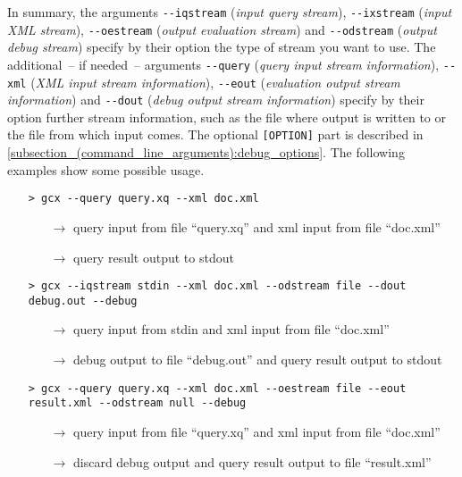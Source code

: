 \noindent In summary, the arguments \texttt{{-}{-}iqstream} (\emph{input query stream}), \texttt{{-}{-}ixstream} (\emph{input XML stream}), \texttt{{-}{-}oestream} (\emph{output evaluation stream}) and \texttt{{-}{-}odstream} (\emph{output debug stream}) specify by their option the type of stream you want to use. The additional~-- if needed~-- arguments \texttt{{-}{-}query} (\emph{query input stream information}), \texttt{{-}{-}xml} (\emph{XML input stream information}), \texttt{{-}{-}eout} (\emph{evaluation output stream information}) and \texttt{{-}{-}dout} (\emph{debug output stream information}) specify by their option further stream information, such as the file where output is written to or the file from which input comes. The optional \texttt{[OPTION]} part is described in \autoref{subsection_(command_line_arguments):debug_options}. The following examples show some possible usage.
\begin{itemize}
  \setlength{\itemsep}{0pt}
  \item[] \texttt{> gcx {-}{-}query query.xq {-}{-}xml doc.xml}
  \begin{itemize}
    \setlength{\itemsep}{0pt}
    \item[$\rightarrow$] query input from file \enquote{query.xq} and xml input from file \enquote{doc.xml}
    \item[$\rightarrow$] query result output to stdout
  \end{itemize}
  \item[] \texttt{> gcx {-}{-}iqstream stdin {-}{-}xml doc.xml {-}{-}odstream file {-}{-}dout debug.out {-}{-}debug}
    \begin{itemize}
    \setlength{\itemsep}{0pt}
    \item[$\rightarrow$] query input from stdin and xml input from file \enquote{doc.xml}
    \item[$\rightarrow$] debug output to file \enquote{debug.out} and query result output to stdout
  \end{itemize}
  \item[] \texttt{> gcx {-}{-}query query.xq {-}{-}xml doc.xml {-}{-}oestream file {-}{-}eout result.xml {-}{-}odstream null {-}{-}debug}
    \begin{itemize}
    \setlength{\itemsep}{0pt}
    \item[$\rightarrow$] query input from file \enquote{query.xq} and xml input from file \enquote{doc.xml}
    \item[$\rightarrow$] discard debug output and query result output to file \enquote{result.xml}
  \end{itemize}
\end{itemize}


